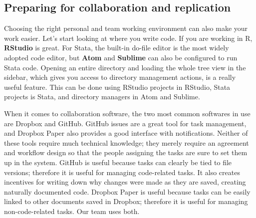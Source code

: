 \subsection{Preparing for collaboration and replication}

Choosing the right personal and team working environment can also make your work easier.
Let's start looking at where you write code. 
If you are working in R, \textbf{RStudio} is great.
For Stata, the built-in do-file editor is the most widely adopted code editor, 
but \textbf{Atom} and \textbf{Sublime} can also be configured to run Stata code.
Opening an entire directory and loading the whole tree view in the sidebar,
which gives you access to directory management actions, is a really useful feature.
This can be done using RStudio projects in RStudio, Stata projects is Stata, and directory managers in Atom and Sublime.


When it comes to collaboration software,
the two most common softwares in use are Dropbox and GitHub.
GitHub issues are a great tool for task management,
and Dropbox Paper also provides a good interface with notifications.
Neither of these tools require much technical knowledge;
they merely require an agreement and workflow design
so that the people assigning the tasks
are sure to set them up in the system.
GitHub is useful because tasks can clearly be tied to file versions;
therefore it is useful for managing code-related tasks. 
It also creates incentives for writing down why changes were made as they are saved,
creating naturally documented code.
Dropbox Paper is useful because tasks can be easily linked to other documents saved in Dropbox;
therefore it is useful for managing non-code-related tasks.
Our team uses both.
